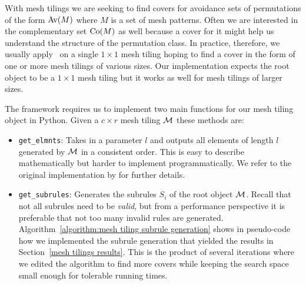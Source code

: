 With mesh tilings we are seeking to find covers for avoidance sets of 
permutations of the form ${\mathrm{Av}\!\left(M\right)}$ where $M$ is a set of mesh patterns. Often we 
are interested in the complementary set ${\mathrm{Co}\!\left(M\right)}$ as well because a cover for it 
might help us understand the structure of the permutation class. In practice, 
therefore, we usually apply \CombCov\ on a single $1 \times 1$ mesh tiling 
hoping to find a cover in the form of one or more mesh tilings of various sizes. 
Our implementation expects the root object to be a $1 \times 1$ mesh tiling but 
it works as well for mesh tilings of larger sizes.

The framework requires us to implement two main functions for our mesh tiling 
object in Python. Given a $c \times r$ mesh tiling ${\mathcal{M}}$ these methods are:
\begin{itemize}[(i)]
  \item \texttt{get\_elmnts}: Takes in a parameter $l$ and outputs all elements 
    of length $l$ generated by ${\mathcal{M}}$ in a consistent order. This is easy to 
    describe mathematically but harder to implement programmatically. We refer 
    to the original implementation by \textcite{bean_permstruct_2017} for 
    further details.
  \item \texttt{get\_subrules}: Generates the subrules $S_i$ of the root object 
    ${\mathcal{M}}$. Recall that not all subrules need to be \emph{valid}, but from a 
    performance perspective it is preferable that not too many invalid rules are
    generated. 
    Algorithm~\ref{algorithm:mesh tiling subrule generation} shows in 
    pseudo-code how we implemented the subrule generation that yielded the 
    results in Section~\ref{mesh tilings results}. This is the product of 
    several iterations where we edited the algorithm to find more covers while 
    keeping the search space small enough for tolerable running times.
\end{itemize}

